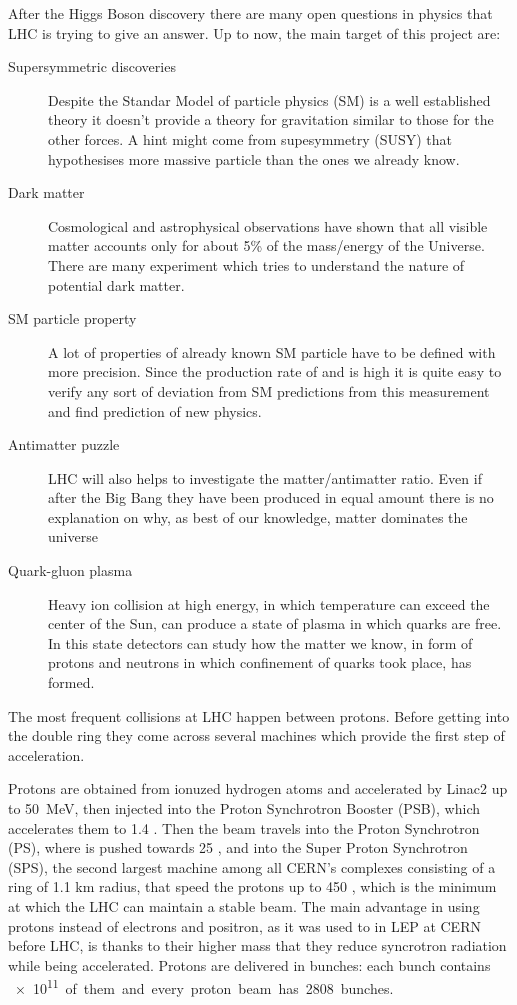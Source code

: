 After the Higgs Boson discovery there are many open questions in physics that LHC is trying to give an answer. Up to now, the main target of this project are:
\begin{description}
\item[Supersymmetric discoveries] Despite the Standar Model of particle physics (SM) is a well established theory it doesn't provide a theory for gravitation similar to those for the other forces. A hint might come from supesymmetry (SUSY) that hypothesises more massive particle than the ones we already know.
\item[Dark matter] Cosmological and astrophysical observations have shown that all visible matter accounts only for about 5\% of the mass/energy of the Universe. There are many experiment which tries to understand the nature of potential dark matter.
\item[SM particle property] A lot of properties of already known SM particle have to be defined with more precision. Since the production rate of \Wboson and \Zboson is high it is quite easy to verify any sort of deviation from SM predictions from this measurement and find prediction of new physics.
\item[Antimatter puzzle] LHC will also helps to investigate the matter/antimatter ratio. Even if after the Big Bang they have been produced in equal amount there is no explanation on why, as best of our knowledge, matter dominates the universe
\item[Quark-gluon plasma] Heavy ion collision at high energy, in which temperature can exceed the center of the Sun, can produce a state of plasma in which quarks are free. In this state detectors can study how the matter we know, in form of protons and neutrons in which confinement of quarks took place, has formed.
\end{description}

The most frequent collisions at LHC happen between protons. Before getting into the double ring they come across several machines which provide the first step of acceleration.

Protons are obtained from ionuzed hydrogen atoms and accelerated by Linac2 up to \SI{50}{MeV}, then injected into the Proton Synchrotron Booster (PSB), which accelerates them to 1.4 \GeV. Then the beam travels into the Proton Synchrotron (PS), where is pushed towards 25 \GeV, and into the Super Proton Synchrotron (SPS),  the second largest machine among all CERN's complexes consisting of a ring of 1.1 km radius, that speed the protons up to 450 \GeV, which is the minimum at which the LHC can maintain a stable beam. The main advantage in using protons instead of electrons and positron, as it was used to in LEP at CERN before LHC, is thanks to their higher mass that they reduce syncrotron radiation while being accelerated. Protons are delivered in bunches: each bunch contains \SI{e11} of them and every proton beam has 2808 bunches.

